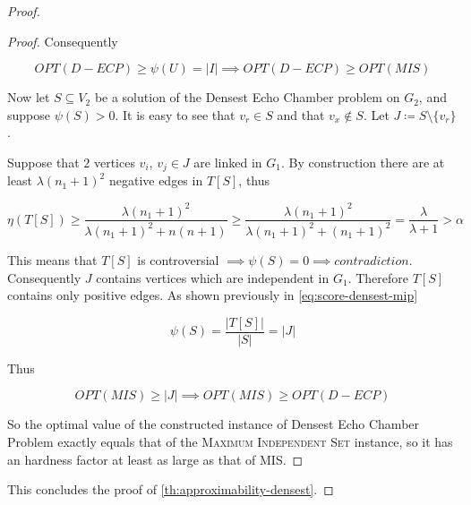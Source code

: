 \begin{proof}
\begin{proof}
		Consequently

		\begin{equation}
			OPT(D-ECP) \geq \psi(U) = |I| \implies OPT(D-ECP) \geq OPT(MIS)
		\end{equation}

		Now let $S \subseteq V_2$ be a solution of the Densest Echo Chamber
		problem on $G_2$, and suppose $\psi(S) > 0$. It is easy to see that
		$v_{r} \in S$ and that $v_{x} \not\in S $. Let $J \coloneqq S \setminus
			\{v_r\}$.

		Suppose that $2$ vertices $v_{i} $, $v_{j} \in J$ are linked in $G_1$.
		By construction there are at least $\lambda (n_1 + 1)^{2} $ negative edges in
		$T[S]$, thus

		\begin{equation}
			\eta(T[S]) \geq \frac{\lambda (n_1+1)^2}{\lambda (n_1+1)^2 + n(n+1)} \geq
			\frac{\lambda (n_1+1)^{2} }{\lambda (n_1+1)^2 + (n_1+1)^2} = \frac{\lambda }{\lambda +
				1} > \alpha
		\end{equation}

		This means that $T[S]$ is controversial $\implies \psi(S) = 0
			\implies contradiction$. Consequently $J$
		contains vertices which are independent in $G_1$. Therefore $T[S]$ contains
		only positive edges. As shown previously in
		\autoref{eq:score-densest-mip}

		\begin{equation}
			\psi(S) = \frac{|T[S]|}{|S|} = |J|
		\end{equation}

		Thus

		\begin{equation}
			OPT(MIS) \geq |J| \implies OPT(MIS) \geq OPT(D-ECP)
		\end{equation}

		So the optimal value of the constructed instance of Densest Echo Chamber Problem
		exactly equals that of the \textsc{Maximum Independent Set} instance, so it
		has an hardness factor at least as large as that of MIS.
	\end{proof}

	This concludes the proof of \autoref{th:approximability-densest}.
\end{proof}
